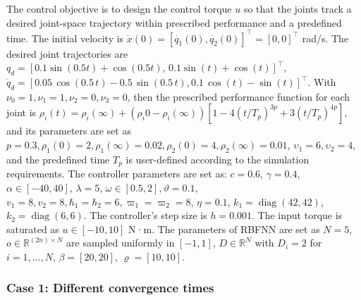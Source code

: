 \documentclass[pdflatex,sn-mathphys-num]{sn-jnl}%
\theoremstyle{thmstyleone}%
\theoremstyle{thmstyletwo}%
\theoremstyle{thmstylethree}%
\begin{document}
The control objective is to design the control torque \( u \) so that the joints track a desired joint-space trajectory within prescribed performance and a predefined time. The initial velocity is $\dot{x}(0)=[\dot{q_1}(0),\dot{q_2}(0)]^{\top}=[0,0]^{\top}$ rad/s. The desired joint trajectories are \( q_{d} = [ 0.1 \sin(0.5t)+\cos(0.5t), \, 0.1 \sin(t)+\cos(t)]^{\top} \), \( \dot{q}_d = [ 0.05\,\cos\left(0.5\,t\right) - 0.5\,\sin\left(0.5\,t\right), 0.1\,\cos\left(t\right) - \sin\left(t\right)]^{\top} \).
With $\nu_0=1, \nu_1=1, \nu_2=0, \nu_3=0$, then the prescribed performance function for each joint is $\rho_i(t) = \rho_i(\infty ) + \left(\rho_i{0} - \rho_i(\infty )\right) [1 - 4\left({t}/{T_{p}}\right)^{3p} + 3\left({t}/{T_{p}}\right)^{4p}]$, and its parameters are set as $p=0.3, \rho_1(0)=2, \rho_1(\infty )=0.02,\rho_2(0)=4, \rho_2(\infty )=0.01$, $\upsilon_{1}=6, \upsilon_{2}=4$, and the predefined time $T_p$ is user-defined according to the simulation requirements. 
The controller parameters are set as: $c=0.6$, $\gamma=0.4$, $\alpha \in [-40,40]$, $\lambda=5$, $\omega \in [0.5, 2], \vartheta=0.1$, $v_{1}=8, v_{2}=8, \hbar_1=\hbar_2=6, \varpi_1=\varpi_2=8$, $\eta=0.1$, $k_1 = \operatorname{diag}(42,42)$, $k_2 = \operatorname{diag}(6,6)$. The controller's step size is $h=0.001$. The input torque is saturated as $u\in[-10,10]$ N·m.
The parameters of RBFNN are set as $N=5$, $o\in\mathbb{R}^{(2n)\times N}$ are sampled uniformly in $[-1,1]$, $D\in\mathbb{R}^N$ with $D_i=2$ for $i=1,\dots,N$, $\beta =[20,20]$, $ \varrho  =[10,10]$.





\subsubsection*{Case 1: Different convergence times}

\end{document}
